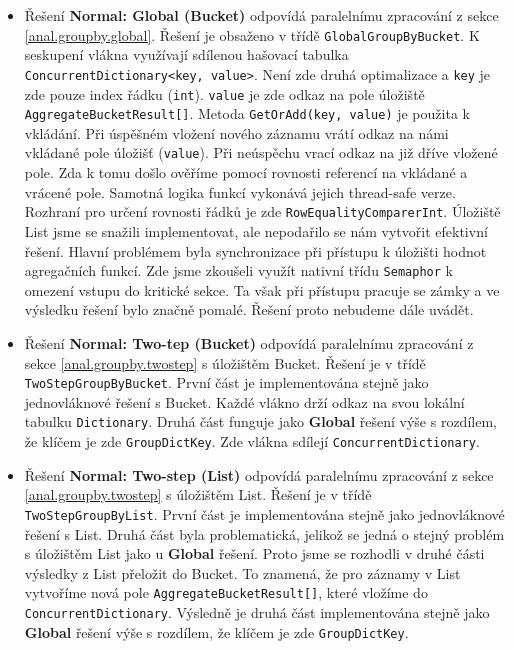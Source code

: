 \begin{itemize}
\item Řešení \textbf{Normal: Global (Bucket)} odpovídá paralelnímu zpracování z sekce \ref{anal.groupby.global}.
Řešení je obsaženo v třídě \texttt{GlobalGroupByBucket}.
K seskupení vlákna využívají sdílenou hašovací tabulka \texttt{ConcurrentDictionary<key, value>}.
Není zde druhá optimalizace a \texttt{key} je zde pouze index řádku (\texttt{int}). 
\texttt{value} je zde odkaz na pole úložiště \texttt{AggregateBucketResult[]}.
Metoda \texttt{GetOrAdd(key, value)} je použita k vkládání.
Při úspěšném vložení nového záznamu vrátí odkaz na námi vkládané pole úložišť (\texttt{value}).
Při neúspěchu vrací odkaz na již dříve vložené pole.
Zda k tomu došlo ověříme pomocí rovnosti referencí na vkládané a vrácené pole. 
Samotná logika funkcí vykonává jejich thread-safe verze. 
Rozhraní pro určení rovnosti řádků je zde \texttt{RowEqualityComparerInt}.
Úložiště List jsme se snažili implementovat, ale nepodařilo se nám vytvořit efektivní řešení.
Hlavní problémem byla synchronizace při přístupu k úložišti hodnot agregačních funkcí.
Zde jsme zkoušeli využít nativní třídu \texttt{Semaphor} k omezení vstupu do kritické sekce.
Ta však při přístupu pracuje se zámky a ve výsledku řešení bylo značně pomalé.
Řešení proto nebudeme dále uvádět.

\item Řešení \textbf{Normal: Two-tep (Bucket)} odpovídá paralelnímu zpracování z sekce \ref{anal.groupby.twostep} s úložištěm Bucket.
Řešení je v třídě \texttt{TwoStepGroupByBucket}.
První část je implementována stejně jako jednovláknové řešení s Bucket.
Každé vlákno drží odkaz na svou lokální tabulku \texttt{Dictionary}.
Druhá část funguje jako \textbf{Global} řešení výše s rozdílem, že klíčem je zde \texttt{GroupDictKey}.
Zde vlákna sdílejí \texttt{ConcurrentDictionary}.

\item Řešení \textbf{Normal: Two-step (List) }odpovídá paralelnímu zpracování z sekce \ref{anal.groupby.twostep} s úložištěm List.
Řešení je v třídě \texttt{TwoStepGroupByList}.
První část je implementována stejně jako jednovláknové řešení s List.
Druhá část byla problematická, jelikož se jedná o stejný problém s úložištěm List jako u \textbf{Global} řešení.
Proto jsme se rozhodli v druhé části výsledky z List přeložit do Bucket.
To znamená, že pro záznamy v List vytvoříme nová pole \texttt{AggregateBucketResult[]}, které vložíme do \texttt{ConcurrentDictionary}.
Výsledně je druhá část implementována stejně jako \textbf{Global} řešení výše s rozdílem, že klíčem je zde \texttt{GroupDictKey}.


\end{itemize}
